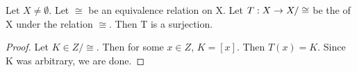 \label{prop:QuotientMapSurjective}
\begin{prop}
    Let $X \neq \emptyset$. 
    Let $\cong$ be an equivalence relation on X.
    Let $T : X\to X/\cong$  be the \QuotientMap of X under the relation $\cong$. 
    Then T is a surjection. 
    \begin{proof}
       Let $K \in Z/\cong$. 
       Then for some $x \in Z$, $K=[x]$. 
       Then $T(x) = K$. 
       Since K was arbitrary, we are done. 
    \end{proof}
\end{prop} 
